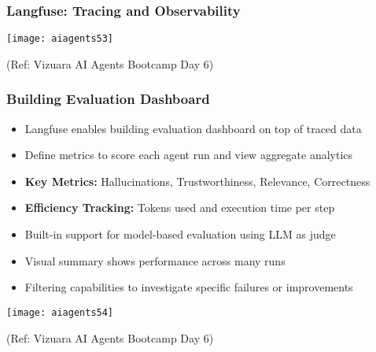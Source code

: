 \begin{frame}[fragile]\frametitle{Langfuse: Tracing and Observability}


		\begin{center}
		\texttt{[image: aiagents53]}
		
		{\tiny (Ref: Vizuara AI Agents Bootcamp Day 6)}
		\end{center}	

\end{frame}


\begin{frame}[fragile]\frametitle{Building Evaluation Dashboard}
      \begin{itemize}
		\item Langfuse enables building evaluation dashboard on top of traced data
		\item Define metrics to score each agent run and view aggregate analytics
		\item \textbf{Key Metrics:} Hallucinations, Trustworthiness, Relevance, Correctness
		\item \textbf{Efficiency Tracking:} Tokens used and execution time per step
		\item Built-in support for model-based evaluation using LLM as judge
		\item Visual summary shows performance across many runs
		\item Filtering capabilities to investigate specific failures or improvements
	  \end{itemize}
		\begin{center}
		\texttt{[image: aiagents54]}
		
		{\tiny (Ref: Vizuara AI Agents Bootcamp Day 6)}
		\end{center}	
\end{frame}

